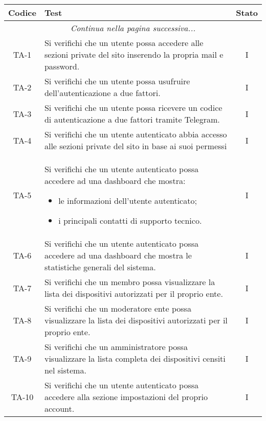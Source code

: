 		\begin{center}
			\begin{longtable}{|c|p{10cm}|c|}
			\hline
			\rowcolor{lighter-grayer}
			\textbf{Codice} & \textbf{Test} & \textbf{Stato}  \\
			\hline
			\endhead
			\hline
	        \multicolumn{3}{|c|}{\textit{Continua nella pagina successiva...}}\\
	        \hline
	        \endfoot
	        \endlastfoot

			\hline
			 TA-1 & Si verifichi che un utente possa accedere alle sezioni private del sito inserendo la propria mail e password.
			  & I \\
			 \hline
			 TA-2 & Si verifichi che un utente possa usufruire dell'autenticazione a due fattori. & I \\
			 \hline
			 TA-3 & Si verifichi che un utente possa ricevere un codice di autenticazione a due fattori tramite Telegram. & I \\
			 \hline
			 TA-4 & Si verifichi che un utente autenticato abbia accesso alle sezioni private del sito in base ai suoi permessi & I \\
			 \hline
			 TA-5 & Si verifichi che un utente autenticato possa accedere ad una dashboard che mostra:
			 \begin{itemize}
			 	\item le informazioni dell'utente autenticato;
			 	\item i principali contatti di supporto tecnico.
			 \end{itemize} & I \\
			 \hline
			 TA-6 & Si verifichi che un utente autenticato possa accedere ad una dashboard che mostra le statistiche generali del sistema. & I \\
			 \hline
			 TA-7 & Si verifichi che un membro possa visualizzare la lista dei dispositivi autorizzati per il proprio ente. & I \\
			 \hline
			 TA-8 & Si verifichi che un moderatore ente possa visualizzare la lista dei dispositivi autorizzati per il proprio ente. & I \\
			 \hline
			 TA-9 & Si verifichi che un amministratore possa visualizzare la lista completa dei dispositivi censiti nel sistema. & I \\
			 \hline
			 TA-10 & Si verifichi che un utente autenticato possa accedere alla sezione impostazioni del proprio account. & I \\

\end{longtable}
\end{center}
